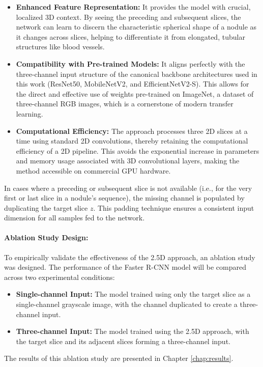 \begin{itemize}
    \item \textbf{Enhanced Feature Representation:} It provides the model with crucial, localized 3D context. By seeing the preceding and subsequent slices, the network can learn to discern the characteristic spherical shape of a nodule as it changes across slices, helping to differentiate it from elongated, tubular structures like blood vessels.

    \item \textbf{Compatibility with Pre-trained Models:} It aligns perfectly with the three-channel input structure of the canonical backbone architectures used in this work (ResNet50, MobileNetV2, and EfficientNetV2-S). This allows for the direct and effective use of weights pre-trained on ImageNet, a dataset of three-channel RGB images, which is a cornerstone of modern transfer learning.

    \item \textbf{Computational Efficiency:} The approach processes three 2D slices at a time using standard 2D convolutions, thereby retaining the computational efficiency of a 2D pipeline. This avoids the exponential increase in parameters and memory usage associated with 3D convolutional layers, making the method accessible on commercial GPU hardware.
\end{itemize}

In cases where a preceding or subsequent slice is not available (i.e., for the very first or last slice in a nodule's sequence), the missing channel is populated by duplicating the target slice $z$. This padding technique ensures a consistent input dimension for all samples fed to the network.

\paragraph{Ablation Study Design:}
To empirically validate the effectiveness of the 2.5D approach, an ablation study was designed. The performance of the Faster R-CNN model will be compared across two experimental conditions:
\begin{itemize}
    \item \textbf{Single-channel Input:} The model trained using only the target slice as a single-channel grayscale image, with the channel duplicated to create a three-channel input.
    \item \textbf{Three-channel Input:} The model trained using the 2.5D approach, with the target slice and its adjacent slices forming a three-channel input. 
\end{itemize}
The results of this ablation study are presented in Chapter \ref{chap:results}.

